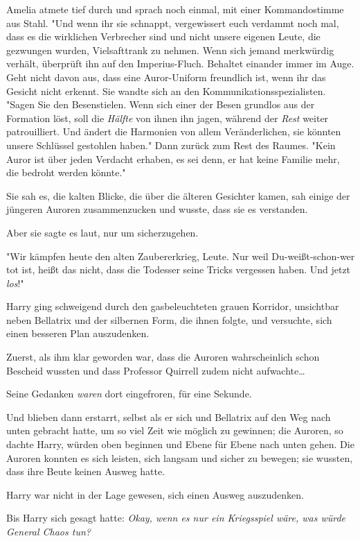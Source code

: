 {Amelia atmete tief durch und sprach noch einmal, mit einer Kommandostimme aus Stahl. "Und wenn ihr sie schnappt, vergewissert euch verdammt noch mal, dass es die wirklichen Verbrecher sind und nicht unsere eigenen Leute, die gezwungen wurden, Vielsafttrank zu nehmen. Wenn sich jemand merkwürdig verhält, überprüft ihn auf den Imperius-Fluch. Behaltet einander immer im Auge. Geht nicht davon aus, dass eine Auror-Uniform freundlich ist, wenn ihr das Gesicht nicht erkennt. Sie wandte sich an den Kommunikationsspezialisten. "Sagen Sie den Besenstielen. Wenn sich einer der Besen grundlos aus der Formation löst, soll die \emph{Hälfte} von ihnen ihn jagen, während der \emph{Rest} weiter patrouilliert. Und ändert die Harmonien von allem Veränderlichen, sie könnten unsere Schlüssel gestohlen haben." Dann zurück zum Rest des Raumes. "Kein Auror ist über jeden Verdacht erhaben, es sei denn, er hat keine Familie mehr, die bedroht werden könnte."

Sie sah es, die kalten Blicke, die über die älteren Gesichter kamen, sah einige der jüngeren Auroren zusammenzucken und wusste, dass sie es verstanden.

Aber sie sagte es laut, nur um sicherzugehen.

"Wir kämpfen heute den alten Zaubererkrieg, Leute. Nur weil Du-weißt-schon-wer tot ist, heißt das nicht, dass die Todesser seine Tricks vergessen haben. Und jetzt \emph{los}!"

Harry ging schweigend durch den gasbeleuchteten grauen Korridor, unsichtbar neben Bellatrix und der silbernen Form, die ihnen folgte, und versuchte, sich einen besseren Plan auszudenken.

Zuerst, als ihm klar geworden war, dass die Auroren wahrscheinlich schon Bescheid wussten und dass Professor Quirrell zudem nicht aufwachte…

Seine Gedanken \emph{waren} dort eingefroren, für eine Sekunde.

Und blieben dann erstarrt, selbst als er sich und Bellatrix auf den Weg nach unten gebracht hatte, um so viel Zeit wie möglich zu gewinnen; die Auroren, so dachte Harry, würden oben beginnen und Ebene für Ebene nach unten gehen. Die Auroren konnten es sich leisten, sich langsam und sicher zu bewegen; sie wussten, dass ihre Beute keinen Ausweg hatte.

Harry war nicht in der Lage gewesen, sich einen Ausweg auszudenken.

Bis Harry sich gesagt hatte: \emph{Okay, wenn es nur ein Kriegsspiel wäre, was würde General Chaos tun?}

}
